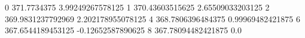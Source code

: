 0 371.7734375 3.99249267578125
1 370.43603515625 2.65509033203125
2 369.9831237792969 2.202178955078125
4 368.7806396484375 0.99969482421875
6 367.6544189453125 -0.12652587890625
8 367.78094482421875 0.0
